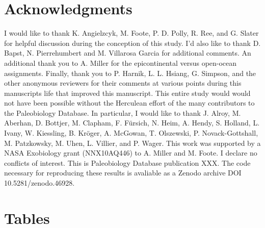 \documentclass[11pt]{article}
\begin{document}

\section*{Acknowledgments}

I would like to thank K. Angielzcyk, M. Foote, P. D. Polly, R. Ree, and G. Slater for helpful discussion during the conception of this study. I'd also like to thank D. Bapst, N. Pierrehumbert and M. Villarosa Garcia for additional comments. An additional thank you to  A. Miller for the epicontinental versus open-ocean assignments. Finally, thank you to P. Harnik, L. L. Hsiang, G. Simpson, and the other anonymous reviewers for their comments at various points during this manuscripts life that improved this manuscript. This entire study would would not have been possible without the Herculean effort of the many contributors to the Paleobiology Database. In particular, I would like to thank J. Alroy, M. Aberhan, D. Bottjer, M. Clapham, F. F\"{u}rsich, N. Heim, A. Hendy, S. Holland, L. Ivany, W. Kiessling, B. Kr\"{o}ger, A. McGowan, T. Olszewski, P. Novack-Gottshall, M. Patzkowsky, M. Uhen, L. Villier, and P. Wager. This work was supported by a NASA Exobiology grant (NNX10AQ446) to A. Miller and M. Foote. I declare no conflicts of interest. This is Paleobiology Database publication XXX. The code necessary for reproducing these results is avaliable as a Zenodo archive DOI 10.5281/zenodo.46928.

\newpage{}





\newpage

\section*{Tables}
\renewcommand{\thetable}{\arabic{table}}
\setcounter{table}{0}
\end{document}
